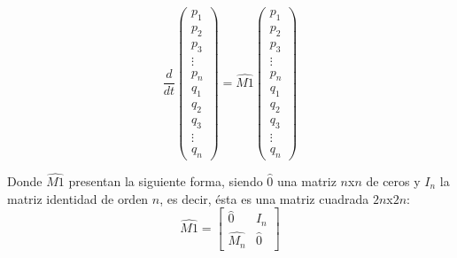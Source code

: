 \documentclass[11pt,letterpaper,twocolumn]{article}
\begin{document}
\[
\dfrac{d}{dt} \left(
\begin{matrix}
p_{1}\\
p_{2}\\
p_{3}\\
\vdots\\
p_{n}\\
q_{1}\\
q_{2}\\
q_{3}\\
\vdots\\
q_{n}
\end{matrix} \right) = \hat{M1}  \left(
\begin{matrix}
p_{1}\\
p_{2}\\
p_{3}\\
\vdots\\
p_{n}\\
q_{1}\\
q_{2}\\
q_{3}\\
\vdots\\
q_{n}
\end{matrix} \right)
\] 
\par 
Donde $\hat{M1}$ presentan la siguiente forma, siendo $\hat{0}$ una matriz $n$x$n$ de ceros y $I_{n}$ la matriz identidad de orden $n$, es decir, ésta es una matriz cuadrada $2n$x$2n$: 
\[ \hat{M1} = \left[
\begin{matrix}
\hat{0} &  I_{n}\\
\hat{M_{n}} & \hat{0}
\end{matrix}  \right]
\]
\end{document}
